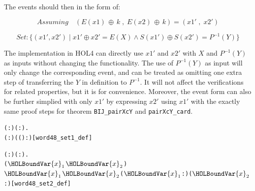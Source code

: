 \documentclass{article}
\begin{document}
The events should then in the form of:

\begin{equation*}
   Assuming \quad(E(x1)\,\oplus\, k\;,\; E(x2)\,\oplus\, k)= (x1'\;,\;x2')
\end{equation*}

\begin{equation*}
Set: \{(x1', x2') \;|\; x1' \oplus x2' = E(X) \land S(x1') \oplus S(x2')= P^{-1}(Y)\}
\end{equation*}

The implementation in HOL4 can directly use $x1'$ and $x2'$ with $X$ and $P^{-1}(Y)$ as inputs without changing the
functionality. The use of $P^{-1}(Y)$ as input will only change the corresponding event,
and can be treated as omitting one extra step of transferring the $Y$ in definition to $P^{-1}$. It will not affect the
verifications for related
properties, but it is for convenience. Moreover, the event form can also be further simplied with only $x1'$ by expressing
$x2'$ using $x1'$ with the exactly same proof steps for theorem \verb|BIJ_pairXcY| and \verb|pairXcY_card|.

\begin{alltt}
\HOLTokenTurnstile{} \HOLSymConst{\HOLTokenForall{}}( :) ( :).
        \HOLSymConst{=}
     \HOLTokenLeftbrace{} \HOLTokenBar{} (  :) \HOLSymConst{\HOLTokenEor{}} ( ( \HOLSymConst{\HOLTokenEor{}}  ) :) \HOLSymConst{=} \HOLTokenRightbrace{}\hfill{[word48_set1_def]}
\end{alltt}

\begin{alltt}
\HOLTokenTurnstile{} \HOLSymConst{\HOLTokenForall{}}( :) ( :).
        \HOLSymConst{=}
     \HOLTokenLeftbrace{}(\ensuremath{\HOLBoundVar{x}\sb{\mathrm{1}}}\HOLSymConst{,}\ensuremath{\HOLBoundVar{x}\sb{\mathrm{2}}}) \HOLTokenBar{}
      \ensuremath{\HOLBoundVar{x}\sb{\mathrm{1}}} \HOLSymConst{\HOLTokenEor{}} \ensuremath{\HOLBoundVar{x}\sb{\mathrm{2}}} \HOLSymConst{=}   \HOLSymConst{\HOLTokenConj{}} ( \ensuremath{\HOLBoundVar{x}\sb{\mathrm{1}}} :) \HOLSymConst{\HOLTokenEor{}} ( \ensuremath{\HOLBoundVar{x}\sb{\mathrm{2}}} :) \HOLSymConst{=} \HOLTokenRightbrace{}\hfill{[word48_set2_def]}
\end{alltt}
\end{document}
